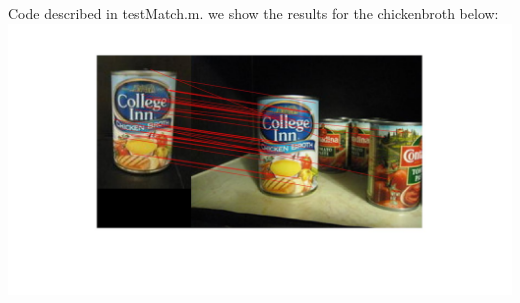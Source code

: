 \documentclass[12pt]{article}
\newenvironment{problem}[2][Problem]{\begin{trivlist}
\item[\hskip \labelsep {\bfseries #1}\hskip \labelsep {\bfseries #2.}]}{\end{trivlist}}
\begin{document}
\begin{problem}{2.4}
Code described in testMatch.m. we show the results for the chickenbroth below:\\
\includegraphics[scale=0.2]{results/matches_plot}\\ 



\end{problem}
\end{document}
